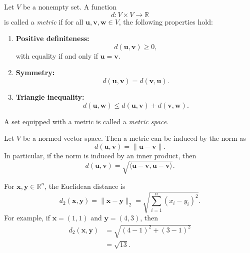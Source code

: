 \begin{definition}[Metric]
	Let $V$ be a nonempty set. A function
	\begin{equation}
		d:V\times V\to\mathbb{R}
	\end{equation}
	is called a \emph{metric} if for all
	$\mathbf{u},\mathbf{v},\mathbf{w}\in V$, the following
	properties hold:
	\begin{enumerate}
		\item \textbf{Positive definiteness:}
		      \begin{equation}
			      d(\mathbf{u},\mathbf{v})\geq 0,
		      \end{equation}
		      with equality if and only if $\mathbf{u}=\mathbf{v}$.

		\item \textbf{Symmetry:}
		      \begin{equation}
			      d(\mathbf{u},\mathbf{v})
			      =d(\mathbf{v},\mathbf{u}).
		      \end{equation}

		\item \textbf{Triangle inequality:}
		      \begin{equation}
			      d(\mathbf{u},\mathbf{w})
			      \leq d(\mathbf{u},\mathbf{v})
			      +d(\mathbf{v},\mathbf{w}).
		      \end{equation}
	\end{enumerate}
	A set equipped with a metric is called a
	\emph{metric space}.
\end{definition}

Let $V$ be a normed vector space. Then a metric
can be induced by the norm as
\begin{equation}
	d(\mathbf{u},\mathbf{v})
	=\|\mathbf{u}-\mathbf{v}\|.
\end{equation}
In particular, if the norm is induced by an
inner product, then
\begin{equation}
	d(\mathbf{u},\mathbf{v})
	=\sqrt{\langle\mathbf{u}-\mathbf{v},
		\mathbf{u}-\mathbf{v}\rangle}.
\end{equation}

\begin{example}
	For $\mathbf{x},\mathbf{y}\in\mathbb{R}^n$,
	the Euclidean distance is
	\begin{equation}
		d_2(\mathbf{x},\mathbf{y})
		=\|\mathbf{x}-\mathbf{y}\|_2
		=\sqrt{\sum_{i=1}^{n}(x_i-y_i)^2}.
	\end{equation}
	For example, if $\mathbf{x}=(1,1)$ and
	$\mathbf{y}=(4,3)$, then
	\begin{align*}
		d_2(\mathbf{x},\mathbf{y})
		 & =\sqrt{(4-1)^2+(3-1)^2} \\
		 & =\sqrt{13}.
	\end{align*}
\end{example}

